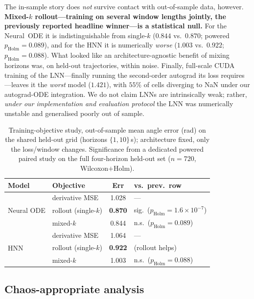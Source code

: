 \documentclass{article}
\begin{document}
The in-sample story does \emph{not} survive contact with out-of-sample data,
however. \textbf{Mixed-$k$ rollout---training on several window lengths jointly,
the previously reported headline winner---is a statistical null.} For the Neural~ODE
it is indistinguishable from single-$k$ ($0.844$ vs.\ $0.870$; powered
$p_{\mathrm{Holm}}{=}0.089$), and for the HNN it is numerically \emph{worse}
($1.003$ vs.\ $0.922$; $p_{\mathrm{Holm}}{=}0.088$). What looked like an
architecture-agnostic benefit of mixing horizons was, on held-out trajectories,
within noise. Finally, full-scale CUDA training of the LNN---finally running the
second-order autograd its loss requires---leaves it the \emph{worst} model
($1.421$), with $55\%$ of cells diverging to NaN under our autograd-ODE integration.
We do not claim LNNs are intrinsically weak; rather, \emph{under our implementation and
evaluation protocol} the LNN was numerically unstable and generalised poorly out of
sample.

\begin{table}[t]
\centering\small
\caption{Training-objective study, out-of-sample mean angle error (rad) on the
shared held-out grid (horizons $\{1,10\}$\,s); architecture fixed, only the
loss/window changes. Significance from a dedicated powered paired study on the full
four-horizon held-out set ($n{=}720$, Wilcoxon$+$Holm).}
\label{tab:objective}
\begin{tabular}{llcl}
\toprule
Model & Objective & Err & vs.\ prev.\ row \\
\midrule
\multirow{3}{*}{Neural ODE}
 & derivative MSE & 1.028 & --- \\
 & rollout (single-$k$) & \textbf{0.870} & sig.\ ($p_{\mathrm{Holm}}{=}1.6{\times}10^{-7}$) \\
 & mixed-$k$ & 0.844 & n.s.\ ($p_{\mathrm{Holm}}{=}0.089$) \\
\midrule
\multirow{3}{*}{HNN}
 & derivative MSE & 1.064 & --- \\
 & rollout (single-$k$) & \textbf{0.922} & (rollout helps) \\
 & mixed-$k$ & 1.003 & n.s.\ ($p_{\mathrm{Holm}}{=}0.088$) \\
\bottomrule
\end{tabular}
\end{table}

\subsection{Chaos-appropriate analysis}
\label{sec:sysid}
\end{document}
